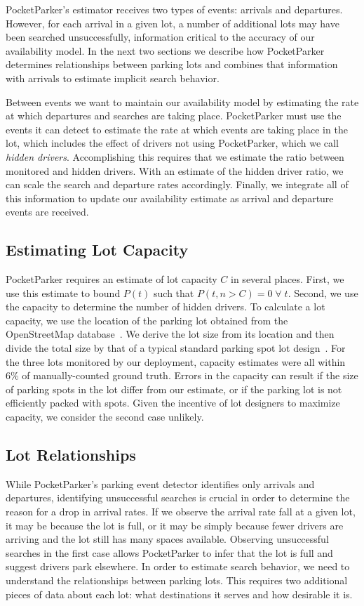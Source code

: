 PocketParker's estimator receives two types of events: arrivals and
departures. However, for each arrival in a given lot, a number of additional
lots may have been searched unsuccessfully, information critical to the
accuracy of our availability model. In the next two sections we describe how
PocketParker determines relationships between parking lots and combines that
information with arrivals to estimate implicit search behavior.

Between events we want to maintain our availability model by estimating the
rate at which departures and searches are taking place. PocketParker must use
the events it can detect to estimate the rate at which events are taking
place in the lot, which includes the effect of drivers not using
PocketParker, which we call \textit{hidden drivers}. Accomplishing this
requires that we estimate the ratio between monitored and hidden drivers.
With an estimate of the hidden driver ratio, we can scale the search and
departure rates accordingly. Finally, we integrate all of this information to
update our availability estimate as arrival and departure events are
received.

\subsection{Estimating Lot Capacity}

PocketParker requires an estimate of lot capacity $C$ in several places.
First, we use this estimate to bound $P(t)$ such that $P(t, n > C) =
0\;\forall\;t$. Second, we use the capacity to determine the number of hidden
drivers. To calculate a lot capacity, we use the location of the parking lot
obtained from the OpenStreetMap database~\cite{openstreetmap}. We derive the
lot size from its location and then divide the total size by that of a
typical standard parking spot lot design~\cite{parkingdesign}. For the three
lots monitored by our deployment, capacity estimates were all within 6\% of
manually-counted ground truth. Errors in the capacity can result if the size
of parking spots in the lot differ from our estimate, or if the parking lot
is not efficiently packed with spots. Given the incentive of lot
designers to maximize capacity, we consider the second case unlikely.

\subsection{Lot Relationships}

While PocketParker's parking event detector identifies only arrivals and
departures, identifying unsuccessful searches is crucial in order to
determine the reason for a drop in arrival rates. If we observe the arrival
rate fall at a given lot, it may be because the lot is full, or it may be
simply because fewer drivers are arriving and the lot still has many spaces
available. Observing unsuccessful searches in the first case allows
PocketParker to infer that the lot is full and suggest drivers park
elsewhere. In order to estimate search behavior, we need to understand the
relationships between parking lots. This requires two additional pieces of
data about each lot: what destinations it serves and how desirable it is.

